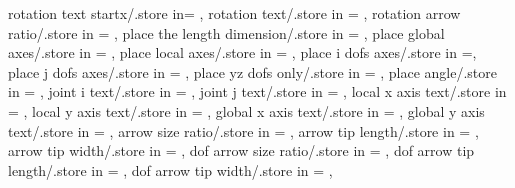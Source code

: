 {rotation text startx/.store in= \rotationanglex,
rotation text/.store in = \rotationtext,
rotation arrow ratio/.store in = \rotationarrowratio,
place the length dimension/.store in = \placelengthdim,
place global axes/.store in = \placeglobalaxes,
place local axes/.store in = \placelocalaxes,
place i dofs axes/.store in =\placeidofs,
place j dofs axes/.store in = \placejdofs,
place yz dofs only/.store in = \placeyzdofsonly,
place angle/.store in = \placeangle,
joint i text/.store in = \jointitext,
joint j text/.store in = \jointjtext,
local x axis text/.store in = \localxtext,
local y axis text/.store in = \localytext,
global x axis text/.store in = \globalxtext,
global y axis text/.store in = \globalytext,
arrow size ratio/.store in = \arrsizrat,
arrow tip length/.store in = \arrlen,
arrow tip width/.store in = \arrwid,
dof arrow size ratio/.store in = \dofarrtipsizrat,
dof arrow tip length/.store in = \dofarrtiplen,
dof arrow tip width/.store in = \dofarrtipwid,}

